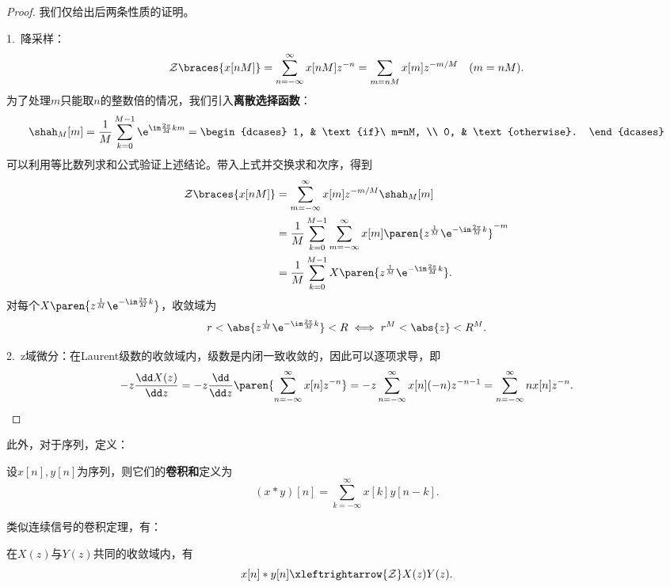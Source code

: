 \begin{proof}
    我们仅给出后两条性质的证明。

    1.\ 降采样：
    \begin{equation}
        \mathcal{Z}\braces{x[nM]}=\sum_{n=-\infty}^{\infty}x[nM]z^{-n}=\sum_{m=nM}x[m]z^{-m/M}\quad(m=nM).
    \end{equation}
    为了处理$m$只能取$n$的整数倍的情况，我们引入\textbf{离散选择函数}：
    \begin{equation}
        \shah_M[m]=\frac{1}{M}\sum_{k=0}^{M-1}\e^{\im\frac{2\pi}{M}km}=\begin{dcases}
            1, & \text{if}\ m=nM,  \\
            0, & \text{otherwise}.
        \end{dcases}
    \end{equation}
    可以利用等比数列求和公式验证上述结论。带入上式并交换求和次序，得到
    \begin{align}
        \mathcal{Z}\braces{x[nM]} & =\sum_{m=-\infty}^{\infty}x[m]z^{-m/M}\shah_M[m]\nonumber                                                              \\
                                  & =\frac{1}{M}\sum_{k=0}^{M-1}\sum_{m=-\infty}^{\infty}x[m]\paren{z^{\frac{1}{M}}\e^{-\im\frac{2\pi}{M}k}}^{-m}\nonumber \\
                                  & =\frac{1}{M}\sum_{k=0}^{M-1}X\paren{z^{\frac{1}{M}}\e^{-\im\frac{2\pi}{M}k}}.
    \end{align}
    对每个$X\paren{z^{\frac{1}{M}}\e^{-\im\frac{2\pi}{M}k}}$，收敛域为
    \begin{equation}
        r<\abs{z^{\frac{1}{M}}\e^{-\im\frac{2\pi}{M}k}}<R\iff r^M<\abs{z}<R^M.
    \end{equation}

    2.\ z域微分：在Laurent级数的收敛域内，级数是内闭一致收敛的，因此可以逐项求导，即
    \begin{equation}
        -z\frac{\dd X(z)}{\dd z}=-z\frac{\dd}{\dd z}\paren{\sum_{n=-\infty}^{\infty}x[n]z^{-n}}=-z\sum_{n=-\infty}^{\infty}x[n](-n)z^{-n-1}=\sum_{n=-\infty}^{\infty}nx[n]z^{-n}.
    \end{equation}
\end{proof}

此外，对于序列，定义：
\begin{definition}[卷积和]
    设$x[n],y[n]$为序列，则它们的\textbf{卷积和}定义为
    \begin{equation}
        (x*y)[n]=\sum_{k=-\infty}^{\infty}x[k]y[n-k].
    \end{equation}
\end{definition}
类似连续信号的卷积定理，有：
\begin{proposition}[卷积和定理]
    在$X(z)$与$Y(z)$共同的收敛域内，有
    \begin{equation}
        x[n]*y[n]\xleftrightarrow{\mathcal{Z}}X(z)Y(z).
    \end{equation}
\end{proposition}

